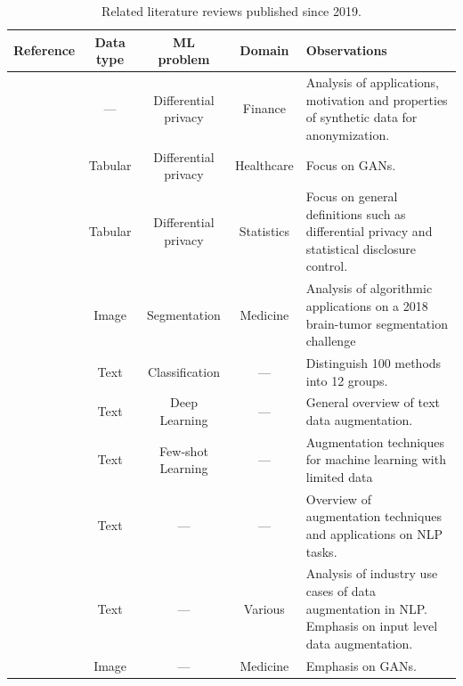 \documentclass[parskip=full]{scrartcl}
\begin{document}
\begin{table}[t!]
    \centering
    \caption{\label{tab:literature-reviews}
        Related literature reviews published since 2019.
    }
    \small{
    \begin{tabularx}{\textwidth}{@{}rcccX@{}}
        \toprule
        Reference & Data type & ML problem & Domain & Observations \\
        \midrule

        \citet{assefa2020generating} & --- & Differential privacy &
        Finance & Analysis of applications, motivation and properties of
        synthetic data for anonymization. \\

        \citet{hernandez2022synthetic} & Tabular & Differential privacy &
        Healthcare & Focus on GANs. \\

        \citet{raghunathan2021synthetic} & Tabular & Differential privacy &
        Statistics & Focus on general definitions such as differential privacy
        and statistical disclosure control.\\

        \citet{nalepa2019data} & Image & Segmentation & Medicine & Analysis of
        algorithmic applications on a 2018 brain-tumor segmentation
        challenge\\

        \citet{bayer2021survey} & Text & Classification & --- & Distinguish
        100 methods into 12 groups. \\

        \citet{shorten2021text} & Text & Deep Learning & --- & General
        overview of text data augmentation. \\

        \citet{chen2021empirical} & Text & Few-shot Learning & --- &
        Augmentation techniques for machine learning with limited data\\

        \citet{feng2021survey} & Text & --- & --- & Overview of augmentation
        techniques and applications on NLP tasks.\\

        \citet{liu2020survey} & Text & --- & Various & Analysis of industry
        use cases of data augmentation in NLP\@. Emphasis on input level data
        augmentation.\\

        \citet{yi2019generative} & Image & --- & Medicine & Emphasis on GANs.\\


\end{tabularx}}
\end{table}
\end{document}
